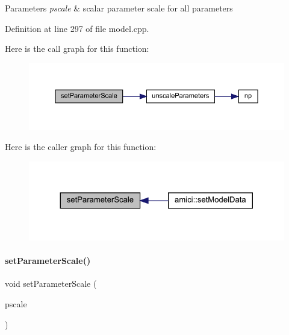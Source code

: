 \begin{DoxyParams}{Parameters}
{\em pscale} & scalar parameter scale for all parameters \\
\hline
\end{DoxyParams}


Definition at line 297 of file model.\+cpp.

Here is the call graph for this function\+:
\nopagebreak
\begin{figure}[H]
\begin{center}
\leavevmode
\includegraphics[width=350pt]{classamici_1_1_model_a7e25febbfd9db80f64a4f73a2718bda7_cgraph}
\end{center}
\end{figure}
Here is the caller graph for this function\+:
\nopagebreak
\begin{figure}[H]
\begin{center}
\leavevmode
\includegraphics[width=324pt]{classamici_1_1_model_a7e25febbfd9db80f64a4f73a2718bda7_icgraph}
\end{center}
\end{figure}
\mbox{\label{classamici_1_1_model_a64aee7434ee9f99f004d8dc8eb776bc6}} 
\paragraph{\texorpdfstring{set\+Parameter\+Scale()}{setParameterScale()}\hspace{0.1cm}{\footnotesize\ttfamily [2/2]}}
{\footnotesize\ttfamily void set\+Parameter\+Scale (\begin{DoxyParamCaption}\item[{const std\+::vector$<$ \mbox{\hyperlink{namespaceamici_a42f062082226e9284c201d9eab71a3a0}{Parameter\+Scaling}} $>$ \&}]{pscale }\end{DoxyParamCaption})}


